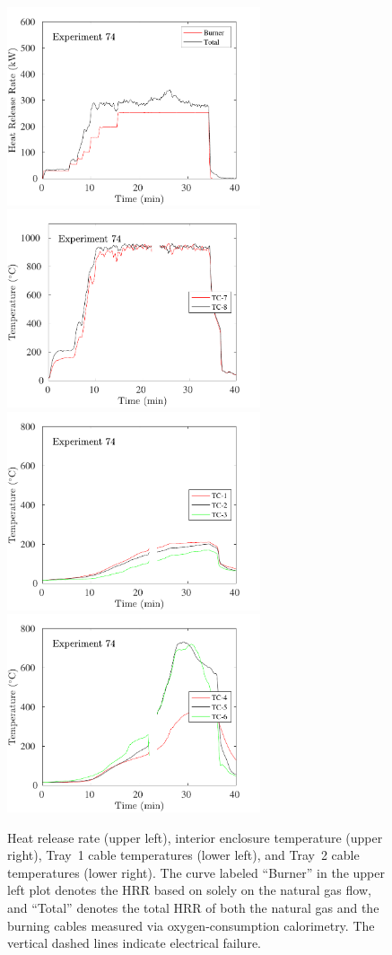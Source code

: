\begin{figure}[H]
\includegraphics[height=2.30in]{../SCRIPT_FIGURES/Test_74_HRR} \hfill
\includegraphics[height=2.30in]{../SCRIPT_FIGURES/Test_74_TC_7-8} \\
\includegraphics[height=2.30in]{../SCRIPT_FIGURES/Test_74_TC_1-3} \hfill
\includegraphics[height=2.30in]{../SCRIPT_FIGURES/Test_74_TC_4-6}
\caption[HRR and temperatures of Experiment 74]{Heat release rate (upper left), interior enclosure temperature (upper right), Tray~1 cable temperatures (lower left), and Tray~2 cable temperatures (lower right). The curve labeled ``Burner'' in the upper left plot denotes the HRR based on solely on the natural gas flow, and ``Total'' denotes the total HRR of both the natural gas and the burning cables measured via oxygen-consumption calorimetry. The vertical dashed lines indicate electrical failure.}
\label{fig:Test_74}
\end{figure}


